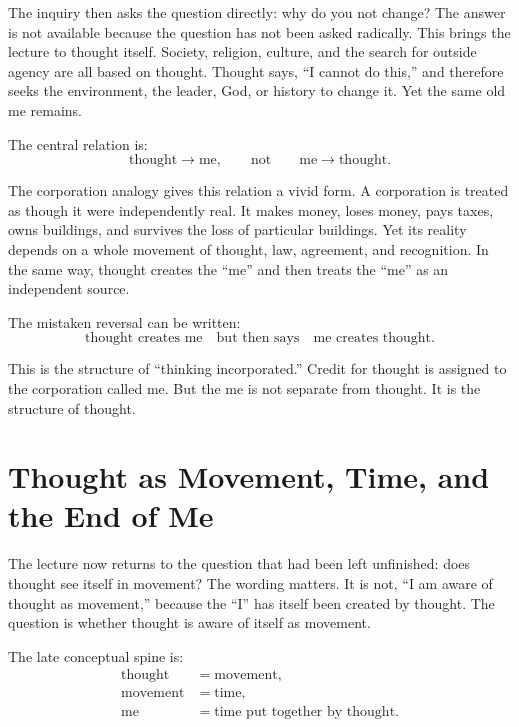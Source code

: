 The inquiry then asks the question directly: why do you not change? The answer is not available because the question has not been asked radically. This brings the lecture to thought itself. Society, religion, culture, and the search for outside agency are all based on thought. Thought says, ``I cannot do this,'' and therefore seeks the environment, the leader, God, or history to change it. Yet the same old me remains.

The central relation is:
\begin{equation}
\text{thought} \longrightarrow \text{me},
\qquad
\text{not}
\qquad
\text{me} \longrightarrow \text{thought}.
\end{equation}

The corporation analogy gives this relation a vivid form. A corporation is treated as though it were independently real. It makes money, loses money, pays taxes, owns buildings, and survives the loss of particular buildings. Yet its reality depends on a whole movement of thought, law, agreement, and recognition. In the same way, thought creates the ``me'' and then treats the ``me'' as an independent source.

The mistaken reversal can be written:
\begin{equation}
\text{thought creates me}
\quad \text{but then says} \quad
\text{me creates thought}.
\end{equation}

This is the structure of ``thinking incorporated.'' Credit for thought is assigned to the corporation called me. But the me is not separate from thought. It is the structure of thought.

\section{Thought as Movement, Time, and the End of Me}

The lecture now returns to the question that had been left unfinished: does thought see itself in movement? The wording matters. It is not, ``I am aware of thought as movement,'' because the ``I'' has itself been created by thought. The question is whether thought is aware of itself as movement.

The late conceptual spine is:
\begin{align}
\text{thought} &= \text{movement}, \\
\text{movement} &= \text{time}, \\
\text{me} &= \text{time put together by thought}.
\end{align}

